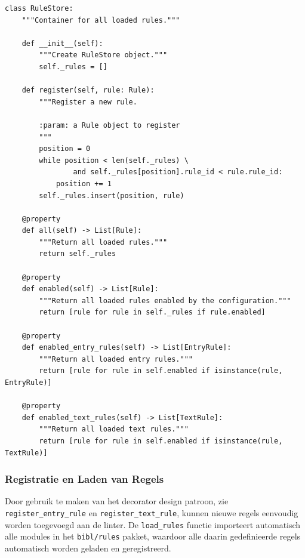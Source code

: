 \begin{verbatim}
class RuleStore:
    """Container for all loaded rules."""

    def __init__(self):
        """Create RuleStore object."""
        self._rules = []

    def register(self, rule: Rule):
        """Register a new rule.

        :param: a Rule object to register
        """
        position = 0
        while position < len(self._rules) \
                and self._rules[position].rule_id < rule.rule_id:
            position += 1
        self._rules.insert(position, rule)

    @property
    def all(self) -> List[Rule]:
        """Return all loaded rules."""
        return self._rules

    @property
    def enabled(self) -> List[Rule]:
        """Return all loaded rules enabled by the configuration."""
        return [rule for rule in self._rules if rule.enabled]

    @property
    def enabled_entry_rules(self) -> List[EntryRule]:
        """Return all loaded entry rules."""
        return [rule for rule in self.enabled if isinstance(rule, EntryRule)]

    @property
    def enabled_text_rules(self) -> List[TextRule]:
        """Return all loaded text rules."""
        return [rule for rule in self.enabled if isinstance(rule, TextRule)]
\end{verbatim}

\subsubsection{Registratie en Laden van Regels}

Door gebruik te maken van het decorator design patroon, zie \texttt{register\_entry\_rule} en \texttt{register\_text\_rule}, kunnen nieuwe regels eenvoudig worden toegevoegd aan de linter. De \texttt{load\_rules} functie importeert automatisch alle modules in het \texttt{bibl/rules} pakket, waardoor alle daarin gedefinieerde regels automatisch worden geladen en geregistreerd.

